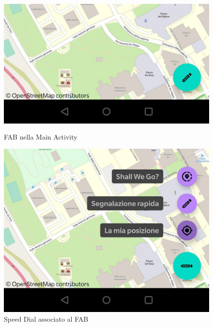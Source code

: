                     \begin{figure}[ht]
                        \begin{minipage}[b]{0.45\linewidth}
                          \includegraphics[width=1.0\textwidth]{capitolo4/figure/fab.jpg}
                            \centering
                          \caption{FAB nella Main Activity}
                          \label{fig:FAB nella Main Activity}
                        \end{minipage}
                        \quad
                        \begin{minipage}[b]{0.45\linewidth}
                           \includegraphics[width=1.0\textwidth]{capitolo4/figure/speeddial.jpg}
                           \centering
                         \caption{Speed Dial associato al FAB}
                         \label{fig:Speed Dial associato al FAB}
                       \end{minipage}
                       \end{figure}

